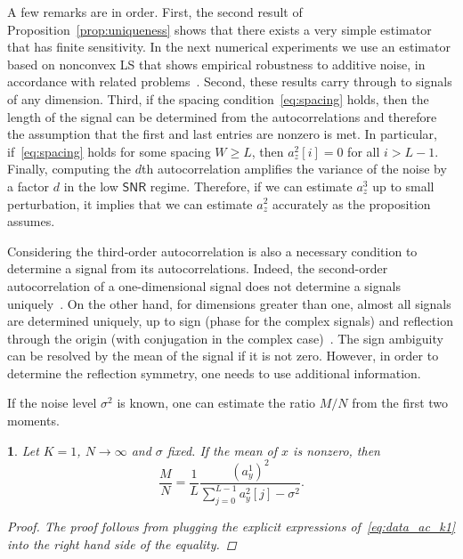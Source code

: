 \documentclass[english,11pt]{article}
\numberwithin{equation}{section}
\theoremstyle{plain}
\theoremstyle{definition}
\theoremstyle{remark}
\theoremstyle{plain}
\theoremstyle{remark}
\theoremstyle{plain}
\theoremstyle{plain}
\newtheorem{proposition}[thm]{\protect\propositionname}
\providecommand{\propositionname}{Proposition}
\newcommand{\SNR}{{\textsf{SNR}}}
\begin{document}
A few remarks are in order. 
First, the second result of Proposition~\ref{prop:uniqueness} shows that there exists a very simple estimator that has finite sensitivity. In the next numerical experiments we use an estimator based on nonconvex LS that shows empirical robustness to additive noise, in accordance with related problems~\cite{bendory2017bispectrum,boumal2017heterogeneous}. 
Second, these results carry through to signals of any dimension.
Third, if the spacing condition~\eqref{eq:spacing} holds, then the length of the signal can be determined from the autocorrelations and 
therefore the assumption that the first and last entries are nonzero is met. In particular, if~\eqref{eq:spacing} holds for some spacing $W\geq L$, then $a_z^2[i]=0$ for all $i>L-1$.
Finally, computing the $d$th autocorrelation amplifies the variance of the noise by a factor $d$ in the low $\SNR$ regime. Therefore, if we can estimate $a_z^3$ up to small perturbation, it implies that we can estimate $a_z^2$ accurately as the proposition assumes. 

Considering the third-order autocorrelation is also a necessary condition to determine a signal from its autocorrelations. Indeed, the second-order autocorrelation of a one-dimensional signal does not determine a signals uniquely~\cite{beinert2015ambiguities,bendory2017fourier}. On the other hand, for dimensions greater than one, almost all signals are determined uniquely, up to sign (phase for the complex signals) and reflection through the origin (with conjugation in the complex case)~\cite{hayes1982reconstruction,hayes1982reducible}. The sign ambiguity can be resolved by the mean of the signal if it is not zero. However,  in order to determine the reflection symmetry, one needs to use additional information.


If the noise level $\sigma^2$ is known, one can estimate the ratio $M/N$ from the first two moments.
\begin{proposition} \label{prop:gamma}
	Let $K=1$, $N\to\infty$ and $\sigma$ fixed. If the mean of $x$ is nonzero, then 
	\begin{equation*}
	\frac{M}{N} = \frac{1}{L}\frac{(a^1_y)^2}{\sum_{j=0}^{L-1}a_y^2[j]-\sigma^2}.
	\end{equation*}
	\begin{proof}
		The proof follows from plugging the explicit expressions of~\eqref{eq:data_ac_k1} into the right hand side of the equality.
	\end{proof}
\end{proposition}
\end{document}

